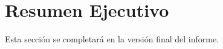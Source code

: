 \section{Resumen Ejecutivo}
\label{sec:resumen}

Esta sección se completará en la versión final del informe.
